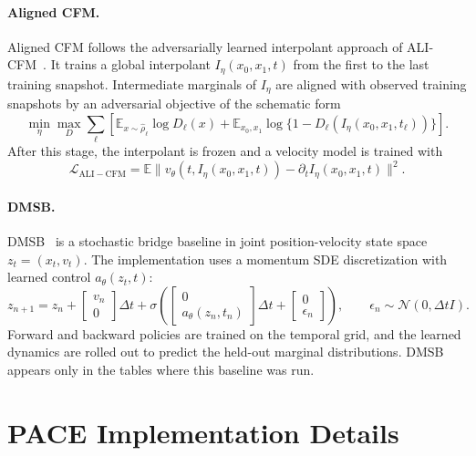 \paragraph{Aligned CFM.}
Aligned CFM follows the adversarially learned interpolant approach of ALI-CFM~\citep{kviman2026multimarginal}. It trains a global interpolant $I_\eta(x_0,x_1,t)$ from the first to the last training snapshot. Intermediate marginals of $I_\eta$ are aligned with observed training snapshots by an adversarial objective of the schematic form
\begin{equation}
  \min_\eta\max_D\sum_{\ell}
  \left[\mathbb{E}_{x\sim\hat\rho_\ell}\log D_\ell(x)
  +\mathbb{E}_{x_0,x_1}\log\{1-D_\ell(I_\eta(x_0,x_1,t_\ell))\}\right].
\end{equation}
After this stage, the interpolant is frozen and a velocity model is trained with
\begin{equation}
  \mathcal{L}_{\mathrm{ALI-CFM}}
  =\mathbb{E}\|v_\theta(t,I_\eta(x_0,x_1,t))-\partial_t I_\eta(x_0,x_1,t)\|^2.
\end{equation}

\paragraph{DMSB.}
DMSB~\citep{chen2023deep} is a stochastic bridge baseline in joint position-velocity state space $z_t=(x_t,v_t)$. The implementation uses a momentum SDE discretization with learned control $a_\theta(z_t,t)$:
\begin{equation}
  z_{n+1}=z_n+\begin{bmatrix}v_n\\0\end{bmatrix}\Delta t
  +\sigma\left(\begin{bmatrix}0\\a_\theta(z_n,t_n)\end{bmatrix}\Delta t
  +\begin{bmatrix}0\\\epsilon_n\end{bmatrix}\right),
  \qquad \epsilon_n\sim\mathcal{N}(0,\Delta t I).
\end{equation}
Forward and backward policies are trained on the temporal grid, and the learned dynamics are rolled out to predict the held-out marginal distributions. DMSB appears only in the tables where this baseline was run.

\section{PACE Implementation Details}
\label{sec:app:pace-implementation}

